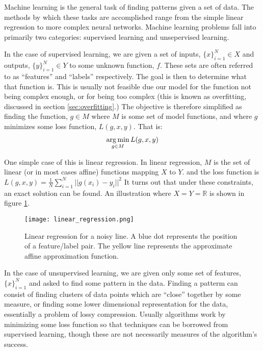 \label{chap:machine_learning}
Machine learning is the general task of finding patterns given a set of data.  The methods by which these tasks are accomplished range from the simple linear regression to more complex neural networks.  Machine learning problems fall into primarily two categories: supervised learning and unsepervised learning.  

In the case of supervised learning, we are given a set of inputs, $\{x\}_{i=1}^N\in X$ and outputs, $\{y\}_{i=1}^N\in Y$ to some unknown function, $f$.  These sets are often referred to as ``features'' and ``labels'' respectively.  The goal is then to determine what that function is.  This is usually not feasible due our model for the function not being complex enough, or for being too complex (this is known as overfitting, discussed in section \ref{sec:overfitting}.)  The objective is therefore simplified as finding the function, $g \in M$ where $M$ is some set of model functions, and where $g$ minimizes some loss function, $L(g,x,y)$.  That is:
\begin{align}
\operatorname*{arg\,min}_{g \in M} L(g,x,y)
\end{align}

One simple case of this is linear regression.  In linear regression, $M$ is the set of linear (or in most cases affine) functions mapping $X$ to $Y$. and the loss function is $L(g,x,y) = \frac{1}{N} \sum_{i=1}^N ||g(x_i)-y_i||^2$  It turns out that under these constraints, an exact solution can be found.  An illustration where $X=Y= \mathbb{R}$ is shown in figure \ref{fig:linear_regression}.

\begin{figure}
    \centering
    \texttt{[image: linear\_regression.png]}
    \caption{Linear regression for a noisy line.  A blue dot represents the position of a feature/label pair.  The yellow line represents the approximate affine approximation function.}
    \label{fig:linear_regression}
\end{figure}

In the case of unsupervised learning, we are given only some set of features, $\{x\}_{i=1}^N$ and asked to find some pattern in the data.  Finding a patterm can consist of finding clusters of data points which are ``close'' together by some measure, or finding some lower dimensional representation for the data, essentially a problem of lossy compression.  Usually algorithms work by minimizing some loss function so that techniques can be borrowed from supervised learning, though these are not necessarily measures of the algorithm's success.  

